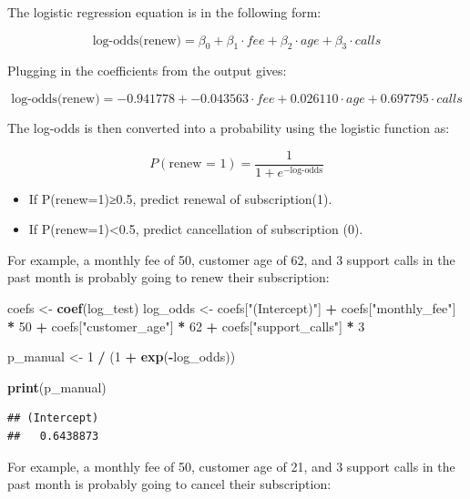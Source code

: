 \documentclass[
]{article}
\newenvironment{Shaded}{\begin{snugshade}}{\end{snugshade}}
\newcommand{\DecValTok}[1]{\textcolor[rgb]{0.00,0.00,0.81}{#1}}
\newcommand{\FunctionTok}[1]{\textcolor[rgb]{0.13,0.29,0.53}{\textbf{#1}}}
\newcommand{\NormalTok}[1]{#1}
\newcommand{\OtherTok}[1]{\textcolor[rgb]{0.56,0.35,0.01}{#1}}
\newcommand{\SpecialCharTok}[1]{\textcolor[rgb]{0.81,0.36,0.00}{\textbf{#1}}}
\newcommand{\StringTok}[1]{\textcolor[rgb]{0.31,0.60,0.02}{#1}}
\begin{document}
The logistic regression equation is in the following form:

\[
\text{log-odds(renew)} = \beta_0 + \beta_1 \cdot fee + \beta_2 \cdot age + \beta_3 \cdot calls
\]

Plugging in the coefficients from the output gives:

\[
\text{log-odds(renew)} = -0.941778 + -0.043563 \cdot fee + 0.026110 \cdot age + 0.697795 \cdot calls
\]

The log-odds is then converted into a probability using the logistic
function as:

\[
P(\text{renew = 1}) = \frac{1}{1+e^{-\text{log-odds}}}
\]

\begin{itemize}
\item
  If P(renew=1)≥0.5, predict renewal of subscription(1).
\item
  If P(renew=1)\textless0.5, predict cancellation of subscription (0).
\end{itemize}

For example, a monthly fee of 50, customer age of 62, and 3 support
calls in the past month is probably going to renew their subscription:

\begin{Shaded}
\begin{Highlighting}[]
\NormalTok{coefs }\OtherTok{\textless{}{-}} \FunctionTok{coef}\NormalTok{(log\_test)}
\NormalTok{log\_odds   }\OtherTok{\textless{}{-}}\NormalTok{ coefs[}\StringTok{"(Intercept)"}\NormalTok{] }\SpecialCharTok{+} 
\NormalTok{  coefs[}\StringTok{"monthly\_fee"}\NormalTok{] }\SpecialCharTok{*} \DecValTok{50} \SpecialCharTok{+}
\NormalTok{  coefs[}\StringTok{"customer\_age"}\NormalTok{] }\SpecialCharTok{*} \DecValTok{62} \SpecialCharTok{+}
\NormalTok{  coefs[}\StringTok{"support\_calls"}\NormalTok{] }\SpecialCharTok{*} \DecValTok{3}

\NormalTok{p\_manual }\OtherTok{\textless{}{-}} \DecValTok{1} \SpecialCharTok{/}\NormalTok{ (}\DecValTok{1} \SpecialCharTok{+} \FunctionTok{exp}\NormalTok{(}\SpecialCharTok{{-}}\NormalTok{log\_odds))}

\FunctionTok{print}\NormalTok{(p\_manual)}
\end{Highlighting}
\end{Shaded}

\begin{verbatim}
## (Intercept) 
##   0.6438873
\end{verbatim}

For example, a monthly fee of 50, customer age of 21, and 3 support
calls in the past month is probably going to cancel their subscription:
\end{document}
